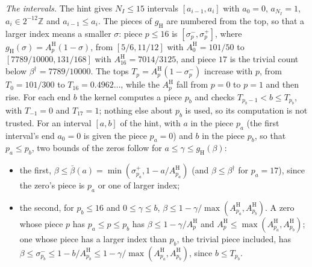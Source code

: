 \documentclass[11pt]{article}
\numberwithin{equation}{section}
\begin{document}
\emph{The intervals.} The hint gives $N_I \le 15$ intervals $[a_{i - 1}, a_i]$ with $a_0 = 0$, $a_{N_I} = 1$, $a_i \in
2^{-12}\mathbb Z$ and $a_{i - 1} \le a_i$. The pieces of $g_{\mathrm H}$ are numbered from the top, so that a larger
index means a smaller $\sigma$: piece $p \le 16$ is
$[\sigma^-_p, \sigma^+_p]$, where $g_{\mathrm H}(\sigma) = A^{\mathrm H}_p(1 - \sigma)$, from $[5/6, 11/12]$ with
$A^{\mathrm H}_0 = 101/50$ to
$[7789/10000, 131/168]$ with $A^{\mathrm H}_{16} = 7014/3125$, and piece $17$ is the trivial count below $\beta^\dagger
=
7789/10000$. The tops $T_p = A^{\mathrm H}_p(1 - \sigma^-_p)$ increase with $p$, from $T_0 = 101/300$ to $T_{16} =
0.4962\ldots$,
while the $A^{\mathrm H}_p$ fall from $p = 0$ to $p = 1$ and then rise. For each end $b$ the kernel computes a piece
$p_b$ and
checks $T_{p_b - 1} < b \le T_{p_b}$, with $T_{-1} = 0$ and $T_{17} = 1$; nothing else about $p_b$ is used, so its
computation is not trusted. For an interval $[a, b]$ of the hint, with $a$ in the piece $p_a$ (the first interval's end
$a_0 = 0$ is given the piece $p_a = 0$) and $b$ in the piece $p_b$, so that $p_a \le p_b$, two bounds of the zeros
follow for $a \le \gamma \le g_{\mathrm H}(\beta)$:
\begin{itemize}
\item the first, $\beta \le \bar\beta(a) = \min(\sigma^+_{p_a}, 1 - a/A^{\mathrm H}_{p_a})$ (and $\beta \le
  \beta^\dagger$ for $p_a = 17$), since the zero's piece is $p_a$ or one of larger index;
\item the second, for $p_b \le 16$ and $0 \le \gamma \le b$, $\beta \le 1 - \gamma/\max(A^{\mathrm H}_{p_a},
  A^{\mathrm H}_{p_b})$. A zero whose piece $p$ has $p_a \le p \le p_b$ has $\beta \le 1 - \gamma/A^{\mathrm H}_p$ and
  $A^{\mathrm H}_p \le \max(A^{\mathrm H}_{p_a}, A^{\mathrm H}_{p_b})$; one whose piece has a larger index than $p_b$,
  the trivial piece included, has $\beta \le \sigma^-_{p_b} \le 1 - b/A^{\mathrm H}_{p_b} \le 1 - \gamma/\max(A^{\mathrm
  H}_{p_a}, A^{\mathrm H}_{p_b})$, since $b \le T_{p_b}$.
\end{itemize}
\end{document}
